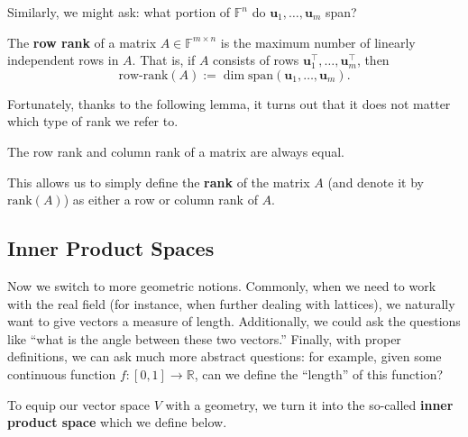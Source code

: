\documentclass[../../book.tex]{subfiles}
\begin{document}
Similarly, we might ask: what portion of $\mathbb{F}^n$ do $\mathbf{u}_1,\dots,\mathbf{u}_m$ span?

\begin{definition}
    The \textbf{row rank} of a matrix $A \in \mathbb{F}^{m \times n}$ is the maximum number of linearly independent rows in $A$. 
    That is, if $A$ consists of rows $\mathbf{u}_1^{\top}, \dots, \mathbf{u}_m^{\top}$, then
    \begin{equation*}
        \text{row-rank}(A) := \dim \text{span}(\mathbf{u}_1,\dots,\mathbf{u}_m).
    \end{equation*}
\end{definition}

Fortunately, thanks to the following lemma, it turns out that it does not matter which type of rank we refer to.

\begin{lemma}
    The row rank and column rank of a matrix are always equal.
\end{lemma}

This allows us to simply define the \textbf{rank} of the matrix $A$ (and denote it by $\text{rank}(A)$) as either a row or column rank of $A$.

\subsection{Inner Product Spaces}

Now we switch to more geometric notions.
Commonly, when we need to work with the real field (for instance, when further dealing with lattices), we naturally want to give vectors a measure of length.
Additionally, we could ask the questions like ``what is the angle between these two vectors.''
Finally, with proper definitions, we can ask much more abstract questions: for example, given some continuous function $f: [0,1] \to \mathbb{R}$, can we define the ``length'' of this function?

To equip our vector space $V$ with a geometry, we turn it into the so-called \textbf{inner product space} which we define below.
\end{document}
